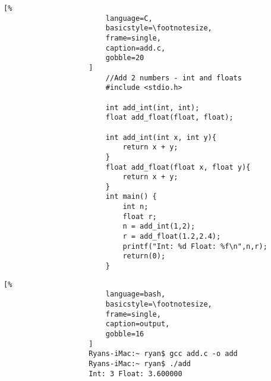 \documentclass[crop=false,class=book,oneside]{standalone}
\begin{document}
                \begin{minipage}[t]{.48\textwidth}
                    \centering
                    \begin{lstlisting}[%
                        language=C,
                        basicstyle=\footnotesize,
                        frame=single,
                        caption=add.c,
                        gobble=20
                    ]
                        //Add 2 numbers - int and floats
                        #include <stdio.h>
                        
                        int add_int(int, int);
                        float add_float(float, float);
                        
                        int add_int(int x, int y){
                            return x + y;
                        }
                        float add_float(float x, float y){
                            return x + y;
                        }
                        int main() {
                            int n;
                            float r;
                            n = add_int(1,2);
                            r = add_float(1.2,2.4);
                            printf("Int: %d Float: %f\n",n,r);
                            return(0);
                        }
                    \end{lstlisting}
                \end{minipage}\hfill
                \begin{minipage}[t]{.48\textwidth}
                    \centering
                    \begin{lstlisting}[%
                        language=bash,
                        basicstyle=\footnotesize,
                        frame=single,
                        caption=output,
                        gobble=16
                    ]
                    Ryans-iMac:~ ryan$ gcc add.c -o add
                    Ryans-iMac:~ ryan$ ./add
                    Int: 3 Float: 3.600000
                    \end{lstlisting}
                \end{minipage}
\end{document}
